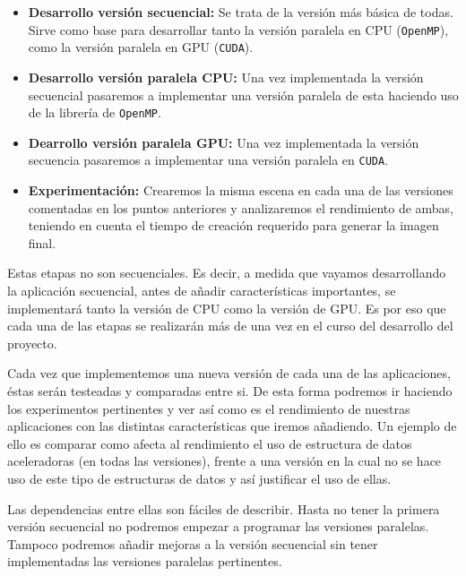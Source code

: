 \documentclass[titlepage,12pt]{report}
\begin{document}
\begin{itemize}

	\item \textbf{Desarrollo versión secuencial:} Se trata de la versión más básica de todas. Sirve como base para desarrollar tanto la versión paralela en CPU (\texttt{OpenMP}), como la versión paralela en GPU (\texttt{CUDA}).
	
	\item \textbf{Desarrollo versión paralela CPU:} Una vez implementada la versión secuencial pasaremos a implementar una versión paralela de esta haciendo uso de la librería de \texttt{OpenMP}. 
	
	\item \textbf{Dearrollo versión paralela GPU:} Una vez implementada la versión secuencia pasaremos a implementar una versión paralela en \texttt{CUDA}.

	\item \textbf{Experimentación:} Crearemos la misma escena en cada una de las versiones comentadas en los puntos anteriores y analizaremos el rendimiento de ambas, teniendo en cuenta el tiempo de creación requerido para generar la imagen final.

\end{itemize}

Estas etapas no son secuenciales. Es decir, a medida que vayamos desarrollando la aplicación secuencial, antes de añadir características importantes, se implementará tanto la versión de CPU como la versión de GPU. Es por eso que cada una de las etapas se realizarán más de una vez en el curso del desarrollo del proyecto.

Cada vez que implementemos una nueva versión de cada una de las aplicaciones, éstas serán testeadas y comparadas entre si. De esta forma podremos ir haciendo los experimentos pertinentes y ver así como es el rendimiento de nuestras aplicaciones con las distintas características que iremos añadiendo. Un ejemplo de ello es comparar como afecta al rendimiento el uso de estructura de datos aceleradoras (en todas las versiones), frente a una versión en la cual no se hace uso de este tipo de estructuras de datos y así justificar el uso de ellas.

Las dependencias entre ellas son fáciles de describir. Hasta no tener la primera versión secuencial no podremos empezar a programar las versiones paralelas. Tampoco podremos añadir mejoras a la versión secuencial sin tener implementadas las versiones paralelas pertinentes.
\end{document}
